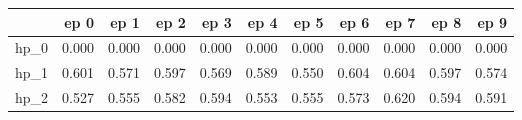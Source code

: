\begin{tabular}{lrrrrrrrrrr}
\toprule
{} &   ep 0 &   ep 1 &   ep 2 &   ep 3 &   ep 4 &   ep 5 &   ep 6 &   ep 7 &   ep 8 &   ep 9 \\
\midrule
hp\_0 &  0.000 &  0.000 &  0.000 &  0.000 &  0.000 &  0.000 &  0.000 &  0.000 &  0.000 &  0.000 \\
hp\_1 &  0.601 &  0.571 &  0.597 &  0.569 &  0.589 &  0.550 &  0.604 &  0.604 &  0.597 &  0.574 \\
hp\_2 &  0.527 &  0.555 &  0.582 &  0.594 &  0.553 &  0.555 &  0.573 &  0.620 &  0.594 &  0.591 \\
\bottomrule
\end{tabular}
